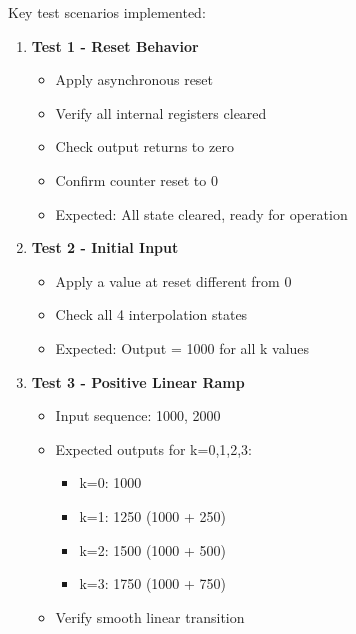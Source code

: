 \documentclass[a4paper,11pt]{article}
\begin{document}
Key test scenarios implemented:
\begin{enumerate}
    \item \textbf{Test 1 - Reset Behavior}
    \begin{itemize}
        \item Apply asynchronous reset
        \item Verify all internal registers cleared
        \item Check output returns to zero
        \item Confirm counter reset to 0
        \item Expected: All state cleared, ready for operation
    \end{itemize}
    
    \item \textbf{Test 2 - Initial Input}
    \begin{itemize}
        \item Apply a value at reset different from 0
        
        \item Check all 4 interpolation states
        \item Expected: Output = 1000 for all k values
    \end{itemize}
    
    \item \textbf{Test 3 - Positive Linear Ramp}
    \begin{itemize}
        \item Input sequence: 1000, 2000
        \item Expected outputs for k=0,1,2,3:
        \begin{itemize}
            \item k=0: 1000
            \item k=1: 1250 (1000 + 250)
            \item k=2: 1500 (1000 + 500)
            \item k=3: 1750 (1000 + 750)
        \end{itemize}
        \item Verify smooth linear transition
    \end{itemize}
    

\end{enumerate}
\end{document}
